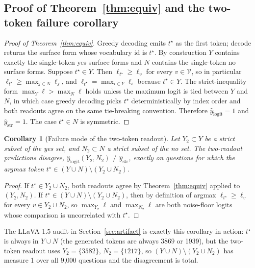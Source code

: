 \documentclass{article}
\newtheorem{corollary}{Corollary}
\begin{document}
\subsection*{Proof of Theorem~\ref{thm:equiv} and the two-token failure corollary}
\label{app:proofs}

\begin{proof}[Proof of Theorem~\ref{thm:equiv}]
Greedy decoding emits $t^\star$ as the first token; \textsf{decode}
returns the surface form whose vocabulary id is $t^\star$. By
construction $Y$ contains exactly the single-token yes surface forms
and $N$ contains the single-token no surface forms. Suppose
$t^\star \in Y$. Then $\ell_{t^\star} \geq \ell_v$ for every
$v \in \mathcal{V}$, so in particular $\ell_{t^\star} \geq \max_{j \in N} \ell_j$,
and $\ell_{t^\star} = \max_{i \in Y} \ell_i$ because $t^\star \in Y$.
The strict-inequality form $\max_Y \ell > \max_N \ell$ holds unless
the maximum logit is tied between $Y$ and $N$, in which case greedy
decoding picks $t^\star$ deterministically by index order and both
readouts agree on the same tie-breaking convention. Therefore
$\hat{y}_{\mathrm{logit}} = 1$ and $\hat{y}_{\mathrm{str}} = 1$. The
case $t^\star \in N$ is symmetric.
\end{proof}

\begin{corollary}[Failure mode of the two-token readout]
\label{cor:fail}
Let $Y_2 \subset Y$ be a strict subset of the yes set, and
$N_2 \subset N$ a strict subset of the no set. The two-readout
predictions disagree, $\hat{y}_{\mathrm{logit}}(Y_2, N_2) \neq
\hat{y}_{\mathrm{str}}$, exactly on questions for which the argmax
token $t^\star \in (Y \cup N) \setminus (Y_2 \cup N_2)$.
\end{corollary}

\begin{proof}
If $t^\star \in Y_2 \cup N_2$, both readouts agree by
Theorem~\ref{thm:equiv} applied to $(Y_2, N_2)$. If
$t^\star \in (Y \cup N) \setminus (Y_2 \cup N_2)$, then by definition
of argmax $\ell_{t^\star} \geq \ell_v$ for every
$v \in Y_2 \cup N_2$, so $\max_{Y_2} \ell$ and $\max_{N_2} \ell$ are
both noise-floor logits whose comparison is uncorrelated with
$t^\star$.
\end{proof}

The LLaVA-1.5 audit in Section~\ref{sec:artifact} is exactly this
corollary in action: $t^\star$ is always in $Y \cup N$ (the
generated tokens are always 3869 or 1939), but the two-token readout
uses $Y_2 = \{3582\}$, $N_2 = \{1217\}$, so
$(Y \cup N) \setminus (Y_2 \cup N_2)$ has measure 1 over all 9{,}000
questions and the disagreement is total.
\end{document}
